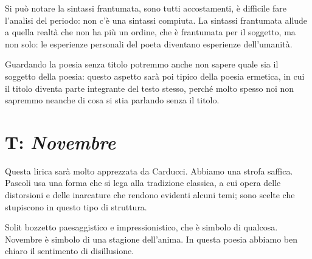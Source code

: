 Si può notare la sintassi frantumata, sono tutti accostamenti, è difficile fare l'analisi del periodo: non c'è una sintassi compiuta. La sintassi frantumata allude a quella realtà che non ha più un ordine, che è frantumata per il soggetto, ma non solo: le esperienze personali del poeta diventano esperienze dell'umanità.

Guardando la poesia senza titolo potremmo anche non sapere quale sia il soggetto della poesia: questo aspetto sarà poi tipico della poesia ermetica, in cui il titolo diventa parte integrante del testo stesso, perché molto spesso noi non sapremmo neanche di cosa si stia parlando senza il titolo.



\section{T: \textit{Novembre}}

Questa lirica sarà molto apprezzata da Carducci.
Abbiamo una strofa saffica.
Pascoli usa una forma che si lega alla tradizione classica, a cui opera delle distorsioni e delle inarcature che rendono evidenti alcuni temi; sono scelte che stupiscono in questo tipo di struttura.

Solit bozzetto paesaggistico e impressionistico, che è simbolo di qualcosa. Novembre è simbolo di una stagione dell'anima.
In questa poesia abbiamo ben chiaro il sentimento di disillusione.

